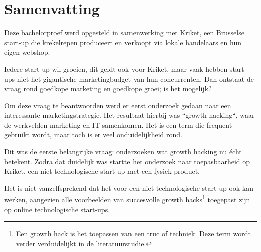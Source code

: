 
%
%


\chapter*{Samenvatting}

Deze bachelorproef werd opgesteld in samenwerking met Kriket, een Brusselse start-up die krekelrepen produceert en verkoopt via lokale handelaars en hun eigen webshop. 

Iedere start-up wil groeien, dit geldt ook voor Kriket, maar vaak hebben start-ups niet het gigantische marketingbudget van hun concurrenten. Dan ontstaat de vraag rond goedkope marketing en goedkope groei; is het mogelijk?

Om deze vraag te beantwoorden werd er eerst onderzoek gedaan naar een interessante marketingstrategie. Het resultaat hierbij was ``growth hacking``, waar de werkvelden marketing en IT samenkomen. Het is een term die frequent gebruikt wordt, maar toch is er veel onduidelijkheid rond.

Dit was de eerste belangrijke vraag: onderzoeken wat growth hacking nu écht betekent. Zodra dat duidelijk was startte het onderzoek naar toepasbaarheid op Kriket, een niet-technologische start-up met een fysiek product. 

Het is niet vanzelfsprekend dat het voor een niet-technologische start-up ook kan werken, aangezien alle voorbeelden van succesvolle growth hacks\footnote{Een growth hack is het toepassen van een truc of techniek. Deze term wordt verder verduidelijkt in de literatuurstudie.} toegepast zijn op online technologische start-ups.

